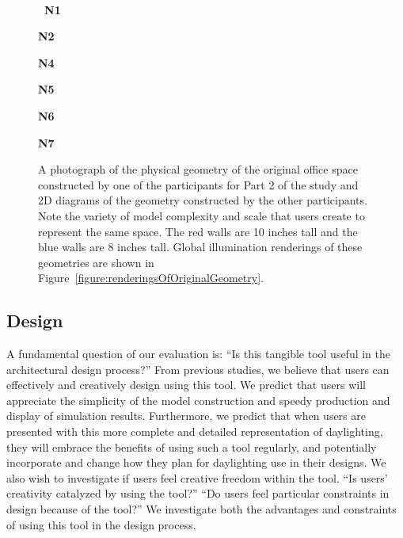 \documentclass[review]{vgtc}                 %
\begin{document}
\begin{figure}[t]
\vspace{0.78in}
\\
\begin{minipage}{1.92in}{\bf ~N1}\end{minipage}
\begin{minipage}{0.95in}{\bf N2}\end{minipage}
\begin{minipage}{0.95in}{\bf N4}\end{minipage}
\begin{minipage}{0.95in}{\bf N5}\end{minipage}
\begin{minipage}{0.95in}{\bf N6}\end{minipage}
\begin{minipage}{0.95in}{\bf N7}\end{minipage}\vspace{-0.0in}%
  \caption{
  \label{figure:original_designs}
A photograph of the physical geometry of the original office space
constructed by one of the participants for Part 2 of the study and 2D
diagrams of the geometry constructed by the other participants.  Note
the variety of model complexity and scale that users create to
represent the same space.  The red walls are 10 inches tall and the
blue walls are 8 inches tall.  Global illumination renderings of these
geometries are shown in
Figure~\ref{figure:renderingsOfOriginalGeometry}.
}
\end{figure}



\subsection{Design}

A fundamental question of our evaluation is: ``Is this tangible tool
useful in the architectural design process?''  From previous studies,
we believe that users can effectively and creatively design using this
tool.  We predict that users will appreciate the simplicity of the
model construction and speedy production and display of simulation
results.  Furthermore, we predict that when users are presented with
this more complete and detailed representation of daylighting, they
will embrace the benefits of using such a tool regularly, and
potentially incorporate and change how they plan for daylighting use
in their designs.  We also wish to investigate if users feel creative
freedom within the tool.  ``Is users' creativity catalyzed by using
the tool?''  ``Do users feel particular constraints in design because
of the tool?''  We investigate both the advantages and constraints of
using this tool in the design process.
\end{document}
